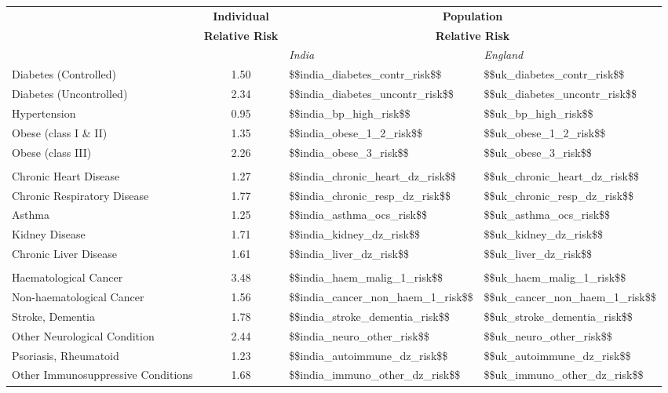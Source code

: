 \begin{tabular}{p{7cm}cp{1.25cm}p{1.5cm}}
& \textbf{{\footnotesize Individual}} &
  \multicolumn{2}{c}{{\textbf{\footnotesize{Population}}}} \\
& \textbf{{\footnotesize Relative Risk}} &
  \multicolumn{2}{c}{{\textbf{\footnotesize{Relative Risk}}}} \\[0.75ex]
  & & \emph{India} & \emph{England} \\[2ex]
Diabetes (Controlled) & \num{1.50} & \num{$$india_diabetes_contr_risk$$} & \num{$$uk_diabetes_contr_risk$$} \\[0.25ex]
Diabetes (Uncontrolled) & \num{2.34} & \num{$$india_diabetes_uncontr_risk$$} & \num{$$uk_diabetes_uncontr_risk$$} \\[0.25ex]
Hypertension & \num{0.95} & \num{$$india_bp_high_risk$$} & \num{$$uk_bp_high_risk$$} \\[0.25ex]
Obese (class I \& II) & \num{1.35} & \num{$$india_obese_1_2_risk$$} & \num{$$uk_obese_1_2_risk$$} \\[0.25ex]
Obese (class III) & \num{2.26} & \num{$$india_obese_3_risk$$} & \num{$$uk_obese_3_risk$$} \\[0.25ex]
\\
Chronic Heart Disease & \num{1.27} & \num{$$india_chronic_heart_dz_risk$$} & \num{$$uk_chronic_heart_dz_risk$$} \\[0.25ex]
Chronic Respiratory Disease & \num{1.77} & \num{$$india_chronic_resp_dz_risk$$} & \num{$$uk_chronic_resp_dz_risk$$} \\[0.25ex]
Asthma & \num{1.25} & \num{$$india_asthma_ocs_risk$$} & \num{$$uk_asthma_ocs_risk$$} \\[0.25ex]
Kidney Disease & \num{1.71} & \num{$$india_kidney_dz_risk$$} & \num{$$uk_kidney_dz_risk$$} \\[0.25ex]
Chronic Liver Disease & \num{1.61} & \num{$$india_liver_dz_risk$$} & \num{$$uk_liver_dz_risk$$} \\[0.25ex]
\\
Haematological Cancer & \num{3.48} & \num{$$india_haem_malig_1_risk$$} & \num{$$uk_haem_malig_1_risk$$} \\[0.25ex]
Non-haematological Cancer & \num{1.56} & \num{$$india_cancer_non_haem_1_risk$$} & \num{$$uk_cancer_non_haem_1_risk$$} \\[0.25ex]
Stroke, Dementia & \num{1.78} & \num{$$india_stroke_dementia_risk$$} & \num{$$uk_stroke_dementia_risk$$} \\[0.25ex]
Other Neurological Condition & \num{2.44} & \num{$$india_neuro_other_risk$$} & \num{$$uk_neuro_other_risk$$} \\[0.25ex]
Psoriasis, Rheumatoid & \num{1.23} & \num{$$india_autoimmune_dz_risk$$} & \num{$$uk_autoimmune_dz_risk$$} \\[0.25ex]
Other Immunosuppressive Conditions & \num{1.68} & \num{$$india_immuno_other_dz_risk$$} & \num{$$uk_immuno_other_dz_risk$$} \\[0.25ex]
\end{tabular}

